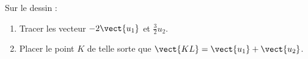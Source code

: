 
\begin{exercice}\label{exosmath-0689}

    Sur le dessin :
    \begin{enumerate}
        \item
            
    Tracer les vecteur \( -2\vect{ u_1 }\) et \( \frac{ 3 }{ 2 }u_{2}\).
\item
Placer le point \( K\) de telle sorte que \( \vect{ KL }=\vect{ u_1 }+\vect{ u_2 }\).
    \end{enumerate}

\begin{center}
   
\end{center}

\end{exercice}
